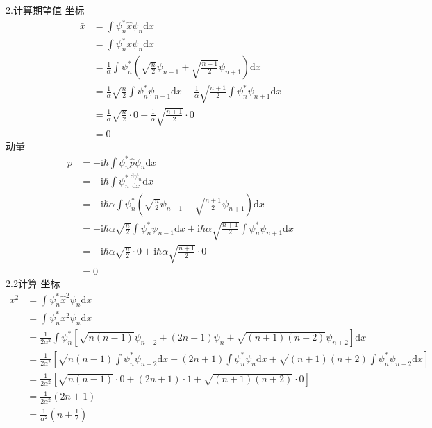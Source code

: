 2.计算期望值
坐标
\begin{equation}
    \begin{aligned}
        \bar{x}&=\int{\psi _{n}^{*}\hat{x}\psi _n\mathrm{d}x}
\\
&=\int{\psi _{n}^{*}x\psi _n\mathrm{d}x}
\\
&=\frac{1}{\alpha}\int{\psi _{n}^{*}\left( \sqrt{\frac{n}{2}}\psi _{n-1}+\sqrt{\frac{n+1}{2}}\psi _{n+1} \right) \mathrm{d}x}
\\
&=\frac{1}{\alpha}\sqrt{\frac{n}{2}}\int{\psi _{n}^{*}\psi _{n-1}\mathrm{d}x}+\frac{1}{\alpha}\sqrt{\frac{n+1}{2}}\int{\psi _{n}^{*}\psi _{n+1}\mathrm{d}x}
\\
&=\frac{1}{\alpha}\sqrt{\frac{n}{2}}\cdot 0+\frac{1}{\alpha}\sqrt{\frac{n+1}{2}}\cdot 0
\\
&=0
    \end{aligned}
\end{equation}
动量
\begin{equation}
    \begin{aligned}
        \bar{p}&=-\mathrm{i}\hbar \int{\psi _{n}^{*}\hat{p}\psi _n\mathrm{d}x}
\\
&=-\mathrm{i}\hbar \int{\psi _{n}^{*}\frac{\mathrm{d}\psi _n}{\mathrm{d}x}\mathrm{d}x}
\\
&=-\mathrm{i}\hbar \alpha \int{\psi _{n}^{*}\left( \sqrt{\frac{n}{2}}\psi _{n-1}-\sqrt{\frac{n+1}{2}}\psi _{n+1} \right) \mathrm{d}x}
\\
&=-\mathrm{i}\hbar \alpha \sqrt{\frac{n}{2}}\int{\psi _{n}^{*}\psi _{n-1}\mathrm{d}x}+\mathrm{i}\hbar \alpha \sqrt{\frac{n+1}{2}}\int{\psi _{n}^{*}\psi _{n+1}\mathrm{d}x}
\\
&=-\mathrm{i}\hbar \alpha \sqrt{\frac{n}{2}}\cdot 0+\mathrm{i}\hbar \alpha \sqrt{\frac{n+1}{2}}\cdot 0
\\
&=0
    \end{aligned}
\end{equation}
2.2计算
坐标
\begin{equation}
    \begin{aligned}
        \overline{x^2}&=\int{\psi _{n}^{*}\hat{x}^2\psi _n\mathrm{d}x}
\\
&=\int{\psi _{n}^{*}x^2\psi _n\mathrm{d}x}
\\
&=\frac{1}{2\alpha ^2}\int{\psi _{n}^{*}\left[ \sqrt{n\left( n-1 \right)}\psi _{n-2}+\left( 2n+1 \right) \psi _n+\sqrt{\left( n+1 \right) \left( n+2 \right)}\psi _{n+2} \right] \mathrm{d}x}
\\
&=\frac{1}{2\alpha ^2}\left[ \sqrt{n\left( n-1 \right)}\int{\psi _{n}^{*}\psi _{n-2}\mathrm{d}x}+\left( 2n+1 \right) \int{\psi _{n}^{*}\psi _n\mathrm{d}x}+\sqrt{\left( n+1 \right) \left( n+2 \right)}\int{\psi _{n}^{*}\psi _{n+2}\mathrm{d}x} \right] 
\\
&=\frac{1}{2\alpha ^2}\left[ \sqrt{n\left( n-1 \right)}\cdot 0+\left( 2n+1 \right) \cdot 1+\sqrt{\left( n+1 \right) \left( n+2 \right)}\cdot 0 \right] 
\\
&=\frac{1}{2\alpha ^2}\left( 2n+1 \right) 
\\
&=\frac{1}{\alpha ^2}\left( n+\frac{1}{2} \right) 
    \end{aligned}
\end{equation}
